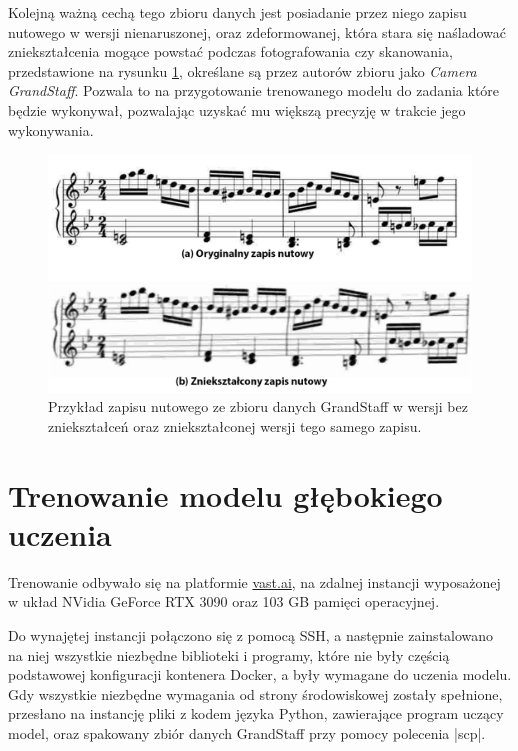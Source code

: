 Kolejną ważną cechą tego zbioru danych jest posiadanie przez niego zapisu nutowego w wersji nienaruszonej, oraz zdeformowanej, która stara się naśladować zniekształcenia mogące powstać podczas fotografowania czy skanowania, przedstawione na rysunku \ref{fig:GS-normal-distorted}, określane są przez autorów zbioru jako \textit{Camera GrandStaff}. Pozwala to na przygotowanie trenowanego modelu do zadania które będzie wykonywał, pozwalając uzyskać mu większą precyzję w trakcie jego wykonywania.

\begin{figure}[htb]
	\centering
	\includegraphics[width=14cm]{images/normal-distorted-GS}
	\caption{Przykład zapisu nutowego ze zbioru danych GrandStaff w wersji bez zniekształceń oraz zniekształconej wersji tego samego zapisu.}
	\label{fig:GS-normal-distorted}
\end{figure}

\section{Trenowanie modelu głębokiego uczenia} \label{ModelTraining}

Trenowanie odbywało się na platformie \url{vast.ai}, na zdalnej instancji wyposażonej w układ NVidia GeForce RTX 3090 oraz 103 GB pamięci operacyjnej.

Do wynajętej instancji połączono się z pomocą SSH, a następnie zainstalowano na niej wszystkie niezbędne biblioteki i programy, które nie były częścią podstawowej konfiguracji kontenera Docker, a były wymagane do uczenia modelu. Gdy wszystkie niezbędne wymagania od strony środowiskowej zostały spełnione, przesłano na instancję pliki z kodem języka Python, zawierające program uczący model, oraz spakowany zbiór danych GrandStaff przy pomocy polecenia \pyth|scp|.

